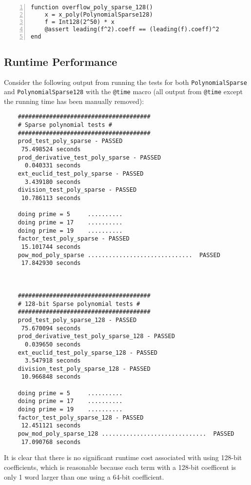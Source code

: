 \documentclass{article}
\theoremstyle{plain}
\numberwithin{theorem}{section}
\numberwithin{example}{section}
\theoremstyle{definition}
\numberwithin{definition}{section}
\begin{document}
\begin{codebox}
    \begin{Verbatim}[numbers=left,xleftmargin=5mm]
function overflow_poly_sparse_128()
    x = x_poly(PolynomialSparse128)
    f = Int128(2^50) * x
    @assert leading(f^2).coeff == (leading(f).coeff)^2
end
    \end{Verbatim}
\end{codebox}

\bigbreak

\subsection{Runtime Performance}
Consider the following output from running the tests for both
\texttt{PolynomialSparse} and \texttt{PolynomialSparse128} with the \texttt{@time}
macro (all output from \texttt{@time} except the running time has been manually
removed):

\begin{Verbatim}
    ######################################
    # Sparse polynomial tests #
    ######################################
    prod_test_poly_sparse - PASSED
     75.498524 seconds
    prod_derivative_test_poly_sparse - PASSED
      0.040331 seconds
    ext_euclid_test_poly_sparse - PASSED
      3.439180 seconds
    division_test_poly_sparse - PASSED
     10.786113 seconds

    doing prime = 5 	..........
    doing prime = 17 	..........
    doing prime = 19 	..........
    factor_test_poly_sparse - PASSED
     15.101744 seconds
    pow_mod_poly_sparse	..............................	PASSED
     17.842930 seconds



    ######################################
    # 128-bit Sparse polynomial tests #
    ######################################
    prod_test_poly_sparse_128 - PASSED
     75.670094 seconds
    prod_derivative_test_poly_sparse_128 - PASSED
      0.039650 seconds
    ext_euclid_test_poly_sparse_128 - PASSED
      3.547918 seconds
    division_test_poly_sparse_128 - PASSED
     10.966848 seconds

    doing prime = 5 	..........
    doing prime = 17 	..........
    doing prime = 19 	..........
    factor_test_poly_sparse_128 - PASSED
     12.451121 seconds
    pow_mod_poly_sparse_128	..............................	PASSED
     17.090768 seconds
\end{Verbatim}
It is clear that there is no significant runtime cost associated with using
128-bit coefficients, which is reasonable because each term with a 128-bit
coefficent is only 1 word larger than one using a 64-bit coefficient.
\end{document}
